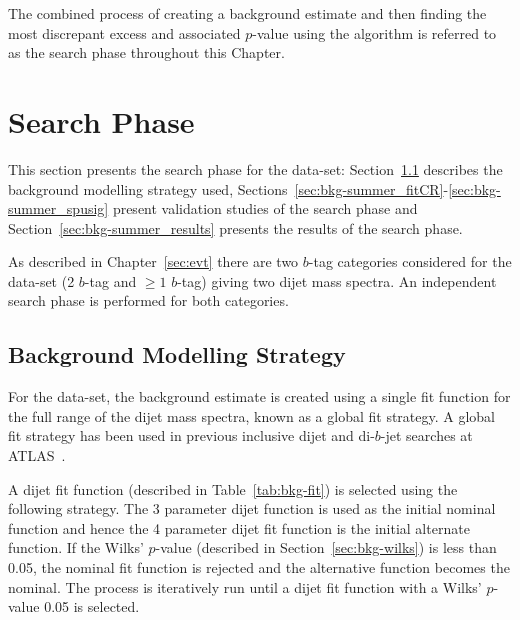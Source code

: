 
The combined process of creating a background estimate and then
finding the most discrepant excess and associated $p$-value using the \bh{} algorithm
is referred to as the search phase throughout this Chapter.

\clearpage
\section{\summer{} Search Phase}
\label{sec:bkg-summer}

This section presents the search phase for the \summer{} data-set:
Section~\ref{sec:bkg-summer_global} describes the background modelling strategy used,
Sections~\ref{sec:bkg-summer_fitCR}-\ref{sec:bkg-summer_spusig}
present validation studies of the search phase
and Section~\ref{sec:bkg-summer_results} presents the results of the search phase.

As described in Chapter~\ref{sec:evt}
there are two $b$-tag categories considered for the \summer{} data-set 
(2 $b$-tag and $\geq1$ $b$-tag) giving two dijet mass spectra.
An independent search phase is performed for both categories.

\subsection{Background Modelling Strategy}
\label{sec:bkg-summer_global}

For the \summer{} data-set, the background estimate is created using
a single fit function for the full range of the dijet mass spectra, known as a global fit strategy.
A global fit strategy has been used in previous inclusive dijet and di-$b$-jet searches at ATLAS~\cite{dijet-mori16_paper,dibjet-mori16_paper}.

A dijet fit function (described in Table~\ref{tab:bkg-fit}) is selected using the following strategy.
The 3 parameter dijet function is used as the initial nominal function and hence the 4 parameter dijet fit function is the initial alternate function.
If the Wilks' \mbox{$p$-value} (described in Section~\ref{sec:bkg-wilks}) is less than 0.05,
the nominal fit function is rejected and the alternative function becomes the nominal.
The process is iteratively run until a dijet fit function with a Wilks' \mbox{$p$-value} \gt{} 0.05 is selected.

